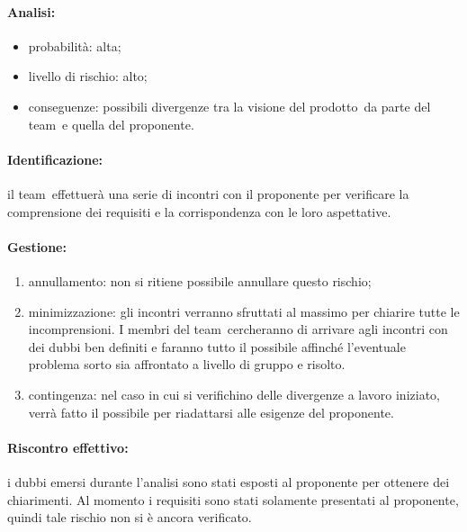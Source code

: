 \documentclass[../PianoProgetto.tex]{subfiles}
\begin{document}
	\paragraph*{Analisi:}
	\begin{itemize}
		\item probabilità: alta;
		\item livello di rischio: alto;
		\item conseguenze: possibili divergenze tra la visione del prodotto\g\ da parte del team\g\ e quella del proponente.
	\end{itemize}	
		
	\paragraph*{Identificazione:} il team\g\ effettuerà una serie di incontri con il proponente per verificare la comprensione dei requisiti e la corrispondenza con le loro aspettative.
	
	\paragraph*{Gestione:}
	\begin{enumerate}
		\item annullamento: non si ritiene possibile annullare questo rischio;
		\item minimizzazione: gli incontri verranno sfruttati al massimo per chiarire tutte le incomprensioni. I membri del team\g\ cercheranno di arrivare agli incontri con dei dubbi ben definiti e faranno tutto il possibile affinché l'eventuale problema sorto sia affrontato a livello di gruppo e risolto.
		\item contingenza: nel caso in cui si verifichino delle divergenze a lavoro iniziato, verrà fatto il possibile per riadattarsi alle esigenze del proponente.
	\end{enumerate}	
	
	\paragraph*{Riscontro effettivo:} i dubbi emersi durante l'analisi sono stati esposti al proponente per ottenere dei chiarimenti. Al momento i requisiti sono stati solamente presentati al proponente, quindi tale rischio non si è ancora verificato.

			
\end{document}
